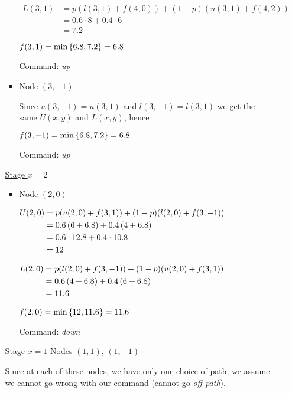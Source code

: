 \begin{prob}
\begin{enumerate}[label = {\textbf{(\greek*)}}]
\begin{sol}
\begin{enumerate}[start = 1, label = {\protect\tsc{$\mathbf{S_{\arabic*}}$}}]
\begin{itemize}
        $\begin{aligned}
            L(3,1) &= p(l(3,1)+f(4,0)) + (1-p)(u(3,1)+f(4,2)) \\
            &= 0.6\cdot8 +0.4\cdot6 \\
            &= 7.2
        \end{aligned}$
        
        \imp $f(3,1)=\min\left\{6.8,7.2\right\}=6.8$
        
        Command: \textit{up}
        
        \item Node $(3,-1)$
        
        Since $u(3,-1)=u(3,1)$ and $l(3,-1)=l(3,1)$ we get the same $U(x,y)$ and $L(x,y)$, hence 
        
        $f(3,-1)=\min\left\{6.8,7.2\right\}=6.8$
        
        Command: \textit{up}
    \end{itemize}
    
    \underline{Stage $x=2$}
    \begin{itemize}
    \item Node $(2,0)$
    
    $\begin{aligned}
            U(2,0) &= p(u(2,0)+f(3,1)) + (1-p)(l(2,0)+f(3,-1)) \\
            &= 0.6\left(6+6.8\right) + 0.4\left(4+6.8\right) \\
            &= 0.6\cdot12.8 +0.4\cdot10.8 \\
            &= 12
        \end{aligned}$
        
        $\begin{aligned}
            L(2,0) &= p(l(2,0)+f(3,-1)) + (1-p)(u(2,0)+f(3,1)) \\
            &= 0.6\left(4+6.8\right) + 0.4\left(6+6.8\right) \\
            &= 11.6
        \end{aligned}$
        
        \imp $f(2,0)=\min\left\{12,11.6\right\}=11.6$
        
        Command: \textit{down}
    \end{itemize}
    
    \underline{Stage $x=1$}
    Nodes $(1,1)$, $(1,-1)$
    
    Since at each of these nodes, we have only one choice of path, we assume we cannot go wrong with our command (cannot go \textit{off-path}).
    

\end{enumerate}
\end{sol}
\end{enumerate}
\end{prob}
